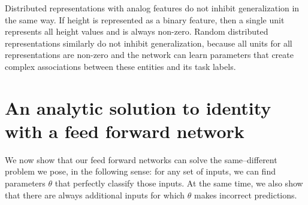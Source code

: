 \documentclass{article}
\begin{document}
Distributed representations with analog features do not inhibit generalization in the same way. If height is represented as a binary feature, then a single unit represents all height values and is always non-zero. Random distributed representations similarly do not inhibit generalization, because all units for all representations are non-zero and the network can learn parameters that create complex associations between these entities and its task labels.


\section{An analytic solution to identity with a feed forward network}\label{app:equality-solution}

We now show that our feed forward networks can solve the same--different problem we pose, in the following sense: for any set of inputs, we can find parameters $\theta$ that perfectly classify those inputs. At the same time, we also show that there are always additional inputs for which $\theta$ makes incorrect predictions.
\end{document}
